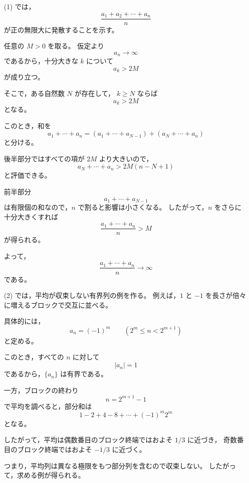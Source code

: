 \begin{strategy}
(1) では，
    \[
        \frac{a_1+a_2+\cdots+a_n}{n}
    \]
    が正の無限大に発散することを示す。

    任意の $M>0$ を取る。
    仮定より
    \[
        a_n\to\infty
    \]
    であるから，十分大きな $k$ について
    \[
        a_k>2M
    \]
    が成り立つ。

    そこで，ある自然数 $N$ が存在して，
    $k\geq N$ ならば
    \[
        a_k>2M
    \]
    となる。

    このとき，和を
    \[
        a_1+\cdots+a_n
        =
        (a_1+\cdots+a_{N-1})
        +
        (a_N+\cdots+a_n)
    \]
    と分ける。

    後半部分ではすべての項が $2M$ より大きいので，
    \[
        a_N+\cdots+a_n>2M(n-N+1)
    \]
    と評価できる。

    前半部分
    \[
        a_1+\cdots+a_{N-1}
    \]
    は有限個の和なので，$n$ で割ると影響は小さくなる。
    したがって，$n$ をさらに十分大きくすれば
    \[
        \frac{a_1+\cdots+a_n}{n}>M
    \]
    が得られる。

    よって，
    \[
        \frac{a_1+\cdots+a_n}{n}\to\infty
    \]
    である。

    (2) では，平均が収束しない有界列の例を作る。
    例えば，$1$ と $-1$ を長さが倍々に増えるブロックで交互に並べる。

    具体的には，
    \[
        a_n=(-1)^m
        \qquad
        (2^m\leq n<2^{m+1})
    \]
    と定める。

    このとき，すべての $n$ に対して
    \[
        |a_n|=1
    \]
    であるから，$\{a_n\}$ は有界である。

    一方，ブロックの終わり
    \[
        n=2^{m+1}-1
    \]
    で平均を調べると，部分和は
    \[
        1-2+4-8+\cdots+(-1)^m2^m
    \]
    となる。

    したがって，平均は偶数番目のブロック終端ではおよそ $1/3$ に近づき，
    奇数番目のブロック終端ではおよそ $-1/3$ に近づく。

    つまり，平均列は異なる極限をもつ部分列を含むので収束しない。
    したがって，求める例が得られる。
\end{strategy}